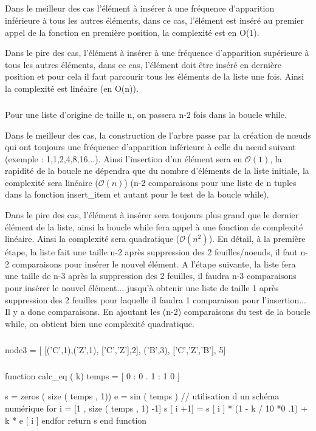 \documentclass[10pt,fleqn]{article} %
\begin{document}
\subparagraph{}
Dans le meilleur des cas l’élément à insérer à une fréquence d’apparition inférieure à tous les autres éléments, dans ce cas, l’élément est inséré au premier appel de la fonction en première position, la complexité est en O(1).

Dans le pire des cas, l’élément à insérer à une fréquence d’apparition supérieure à tous les autres éléments, dans ce cas, l’élément doit être inséré en dernière position et pour cela il faut parcourir tous les éléments de la liste une fois. Ainsi la complexité est linéaire (en O(n)).

\subparagraph{}
Pour une liste d’origine de taille n, on passera n-2 fois dans la boucle while.


Dans le meilleur des cas, la construction de l’arbre passe par la création de nœuds qui ont toujours une fréquence d’apparition inférieure à celle du nœud suivant (exemple : 1,1,2,4,8,16...). Ainsi l’insertion d’un élément sera en $\mathcal{O}(1)$, la rapidité de la boucle ne dépendra que du nombre d’éléments de la liste initiale, la complexité sera linéaire ($\mathcal{O}(n)$) (n-2 comparaisons pour une liste de n tuples dans la fonction insert\_item et autant pour le test de la boucle while).


Dans le pire des cas, l’élément à insérer sera toujours plus grand que le dernier élément de la liste, ainsi la boucle while fera appel à une fonction de complexité linéaire. Ainsi la complexité sera quadratique ($\mathcal{O}(n^2)$). En détail, à la première étape, la liste fait une taille n-2 après suppression des 2 feuilles/noeuds, il faut n-2 comparaisons pour insérer le nouvel élément. A l’étape suivante, la liste fera une taille de n-3 après la suppression des 2 feuilles, il faudra n-3 comparaisons pour insérer le nouvel élément... jusqu’à obtenir une liste de taille 1 après suppression des 2 feuilles pour laquelle il faudra 1 comparaison pour l’insertion... Il y a donc  comparaisons. En ajoutant les (n-2) comparaisons du test de la boucle while, on obtient bien une complexité quadratique.


\subparagraph{}
\begin{python}
node3 = [ [('C',1),('Z',1), ['C','Z'],2], ('B',3), ['C','Z','B'], 5]
\end{python}
\subparagraph{}



\subparagraph{}
\begin{python}
function calc_eq ( k)
    temps = [ 0 : 0 . 1 : 1 0 ]

    s = zeros ( size ( temps ,  1))
    e = sin ( temps )
    // utilisation d un schéma numérique
    for  i  =  [1 ,  size ( temps ,  1) -1]
        s [ i +1] = s [ i ] * (1 - k / 10 *0 .1) + k * e [ i ]
    endfor
    return  s
end function
\end{python}
\end{document}
